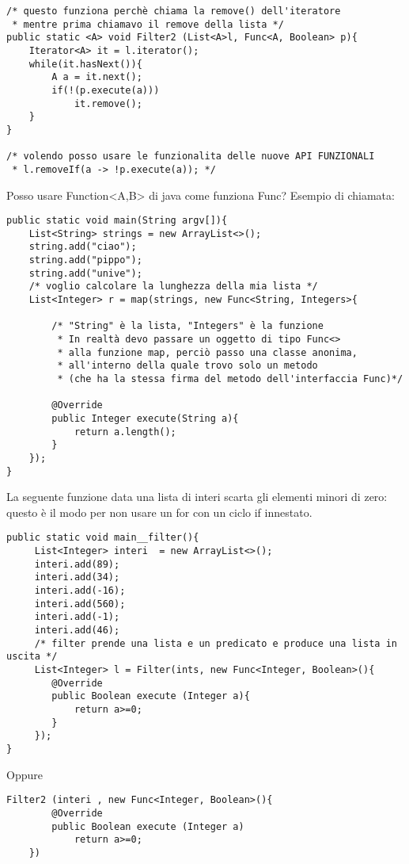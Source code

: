 \begin{lstlisting}[basicstyle=\small,]
/* questo funziona perchè chiama la remove() dell'iteratore
 * mentre prima chiamavo il remove della lista */
public static <A> void Filter2 (List<A>l, Func<A, Boolean> p){
	Iterator<A> it = l.iterator();
	while(it.hasNext()){
		A a = it.next();
		if(!(p.execute(a)))
			it.remove();
	}
}

/* volendo posso usare le funzionalita delle nuove API FUNZIONALI
 * l.removeIf(a -> !p.execute(a)); */
\end{lstlisting}

\noindent Posso usare Function<A,B> di java come funziona Func? \newline
Esempio di chiamata:

\begin{lstlisting}[basicstyle=\small,]
public static void main(String argv[]){
	List<String> strings = new ArrayList<>();
	string.add("ciao");
	string.add("pippo");
	string.add("unive");
	/* voglio calcolare la lunghezza della mia lista */
	List<Integer> r = map(strings, new Func<String, Integers>{ 
	
		/* "String" è la lista, "Integers" è la funzione
         * In realtà devo passare un oggetto di tipo Func<>
         * alla funzione map, perciò passo una classe anonima,
         * all'interno della quale trovo solo un metodo
         * (che ha la stessa firma del metodo dell'interfaccia Func)*/
         
		@Override 
		public Integer execute(String a){
			return a.length();
		}	
	});
}
\end{lstlisting}


\noindent La seguente funzione data una lista di interi scarta gli elementi minori di zero: questo è il modo per non usare un for con un ciclo if innestato.

\begin{lstlisting}[basicstyle=\small,]
public static void main__filter(){
	 List<Integer> interi  = new ArrayList<>();
	 interi.add(89);
	 interi.add(34);
	 interi.add(-16);
	 interi.add(560);
	 interi.add(-1);
	 interi.add(46);
	 /* filter prende una lista e un predicato e produce una lista in uscita */
	 List<Integer> l = Filter(ints, new Func<Integer, Boolean>(){
	 	@Override
	 	public Boolean execute (Integer a){
	 		return a>=0;
	 	}
	 });
}
\end{lstlisting}

\noindent Oppure 

\begin{lstlisting}[basicstyle=\small,]
	Filter2 (interi , new Func<Integer, Boolean>(){
		@Override
		public Boolean execute (Integer a)
			return a>=0;
	})
\end{lstlisting}

